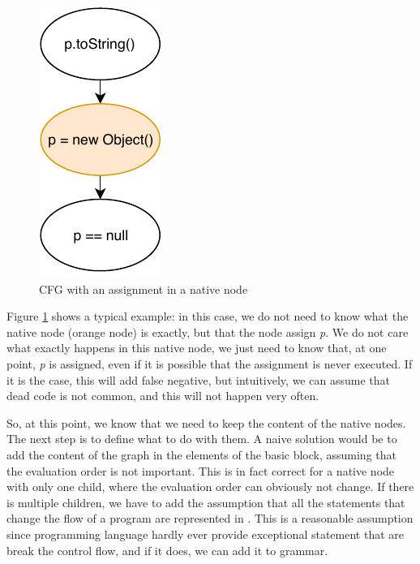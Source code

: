 \begin{figure}[h]
	\caption{CFG with an assignment in a native node}
	\label{figure:cfg-with-assignment-native}
	\includegraphics[]{figure/cfg-with-assignment-native.pdf}
\end{figure}

Figure \ref{figure:cfg-with-assignment-native} shows a typical example: in this case, we do not need to know what the native node (orange node) is exactly, but that the node assign \emph{p}. We do not care what exactly happens in this native node, we just need to know that, at one point, \emph{p} is assigned, even if it is possible that the assignment is never executed. If it is the case, this will add false negative, but intuitively, we can assume that dead code is not common, and this will not happen very often.

So, at this point, we know that we need to keep the content of the native nodes. 
The next step is to define what to do with them. 
A naive solution would be to add the content of the graph in the elements of the basic block, assuming that the evaluation order is not important. 
This is in fact correct for a native node with only one child, where the evaluation order can obviously not change. 
If there is multiple children, we have to add the assumption that all the statements that change the flow of a program are represented in \slang{}. 
This is a reasonable assumption since programming language hardly ever provide exceptional statement that are break the control flow, and if it does, we can add it to \slang{} grammar.




